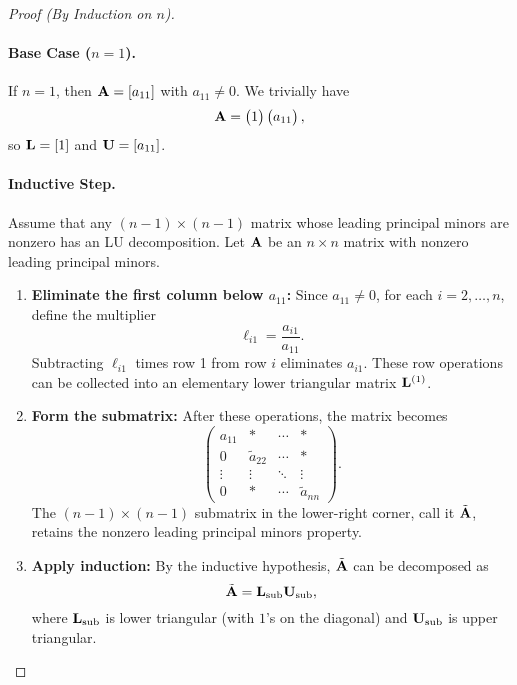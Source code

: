 \documentclass[../../cs111_main.tex]{subfiles}
\begin{document}
\begin{proof}[Proof (By Induction on $n$)]
\paragraph{Base Case ($n=1$).}
If $n=1$, then $\mathbf{A} = [a_{11}]$ with $a_{11} \neq 0$. We trivially have
\[
\mathbf{A} = \begin{pmatrix} 1 \end{pmatrix}
\begin{pmatrix} a_{11} \end{pmatrix},
\]
so $\mathbf{L} = [1]$ and $\mathbf{U} = [a_{11}]$.

\paragraph{Inductive Step.}
Assume that any $(n-1) \times (n-1)$ matrix whose leading principal minors are nonzero has an LU decomposition. Let $\mathbf{A}$ be an $n \times n$ matrix with nonzero leading principal minors.

\begin{enumerate}
    \item \textbf{Eliminate the first column below $a_{11}$:} Since $a_{11} \neq 0$, for each $i=2,\dots,n$, define the multiplier
    \[
    \ell_{i1} = \frac{a_{i1}}{a_{11}}.
    \]
    Subtracting $\ell_{i1}$ times row 1 from row $i$ eliminates $a_{i1}$. These row operations can be collected into an elementary lower triangular matrix $\mathbf{L}^{(1)}$.

    \item \textbf{Form the submatrix:} After these operations, the matrix becomes
    \[
    \begin{pmatrix}
    a_{11} & * & \cdots & * \\
    0 & \tilde{a}_{22} & \cdots & * \\
    \vdots & \vdots & \ddots & \vdots \\
    0 & * & \cdots & \tilde{a}_{nn}
    \end{pmatrix}.
    \]
    The $(n-1)\times(n-1)$ submatrix in the lower-right corner, call it $\tilde{\mathbf{A}}$, retains the nonzero leading principal minors property.

    \item \textbf{Apply induction:} By the inductive hypothesis, $\tilde{\mathbf{A}}$ can be decomposed as
    \[
    \tilde{\mathbf{A}} = \mathbf{L}_{\text{sub}} \mathbf{U}_{\text{sub}},
    \]
    where $\mathbf{L}_{\text{sub}}$ is lower triangular (with $1$'s on the diagonal) and $\mathbf{U}_{\text{sub}}$ is upper triangular.


\end{enumerate}
\end{proof}
\end{document}
